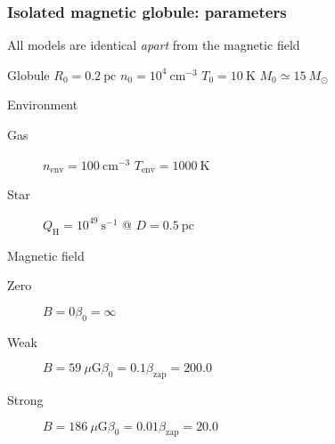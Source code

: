 \documentclass{beamer}
\begin{document}
\begin{frame}
  \frametitle{Isolated magnetic globule: parameters}
  All models are identical \emph{apart} from the magnetic field
  \begin{block}{Globule}
    \smallskip
    $R_0 = 0.2~\mathrm{pc}$ \quad $n_0 = 10^4~\mathrm{cm}^{-3}$ \quad
    $T_0 = 10~\mathrm{K}$ \quad $M_0 \simeq 15~M_\odot$
  \end{block}
  \begin{block}{Environment}
    \begin{description}
      \item[Gas]\quad $n_\mathrm{env} = 100~\mathrm{cm}^{-3}$ \quad $T_\mathrm{env} = 1000~\mathrm{K}$\\
      \item[Star]\quad $Q_\mathrm{H} = 10^{49}~\mathrm{s}^{-1}$ @ $D = 0.5~\mathrm{pc}$
    \end{description}
  \end{block}
  \begin{block}{Magnetic field}
    \begin{description}
    \item[Zero]\quad $B = 0$\quad $\beta_0 = \infty$ 
    \item[Weak]\quad $B = 59~\mu\mathrm{G}$\quad $\beta_0 = 0.1$\quad $\beta_\mathrm{zap} = 200.0$ 
    \item[Strong]\quad $B = 186~\mu\mathrm{G}$\quad $\beta_0 = 0.01$\quad $\beta_\mathrm{zap} = 20.0$ 
    \end{description}
  \end{block}
\end{frame}
\end{document}
